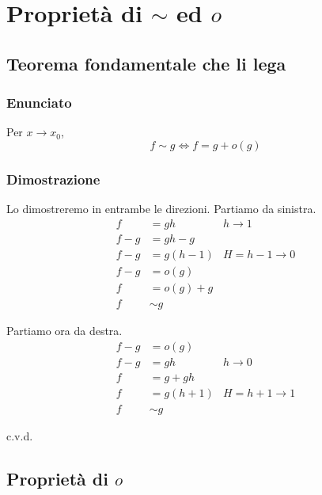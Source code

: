\documentclass[../../dimostrazioni]{subfiles}
\begin{document}
    \chapter{Proprietà di \texorpdfstring{\(\sim\) ed \(o\)}{asintotico ed o-piccolo}}

        \section*{Teorema fondamentale che li lega}

            \subsection*{Enunciato}

                Per \(x \to x_0\),
                \[
                    f \sim g \iff f = g + o(g)
                \]

            \subsection*{Dimostrazione}

                Lo dimostreremo in entrambe le direzioni. Partiamo da sinistra.
                \begin{align*}
                    f &= gh & h \to 1\\
                    f - g &= gh - g\\
                    f - g &= g (h - 1) & H = h - 1 \to 0\\
                    f - g &= o(g)\\
                    f &= o(g) + g\\
                    f &\sim g
                \end{align*}

                Partiamo ora da destra.
                \begin{align*}
                    f - g &= o(g)\\
                    f - g &= gh & h \to 0\\
                    f &= g + gh\\
                    f &= g (h + 1) & H = h + 1 \to 1\\
                    f &\sim g
                \end{align*}
                
                c.v.d.

        \section*{Proprietà di \(o\)}
\end{document}
